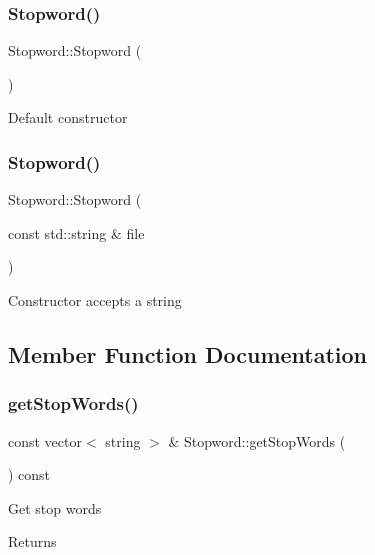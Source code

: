 \subsubsection{\texorpdfstring{Stopword()}{Stopword()}\hspace{0.1cm}{\footnotesize\ttfamily [1/2]}}
{\footnotesize\ttfamily Stopword\+::\+Stopword (\begin{DoxyParamCaption}{ }\end{DoxyParamCaption})}

Default constructor \mbox{\label{classStopword_a7905aacd5d59b997b50506a71d12a0f7}} 
\subsubsection{\texorpdfstring{Stopword()}{Stopword()}\hspace{0.1cm}{\footnotesize\ttfamily [2/2]}}
{\footnotesize\ttfamily Stopword\+::\+Stopword (\begin{DoxyParamCaption}\item[{const std\+::string \&}]{file }\end{DoxyParamCaption})}

Constructor accepts a string 

\subsection{Member Function Documentation}
\mbox{\label{classStopword_adf2fd764697815c3caa65b6ace21eed1}} 
\subsubsection{\texorpdfstring{get\+Stop\+Words()}{getStopWords()}}
{\footnotesize\ttfamily const vector$<$ string $>$ \& Stopword\+::get\+Stop\+Words (\begin{DoxyParamCaption}{ }\end{DoxyParamCaption}) const}

Get stop words \begin{DoxyReturn}{Returns}

\end{DoxyReturn}
\mbox{\label{classStopword_a2acde54983583632735c84fdb0c12d7e}} 
